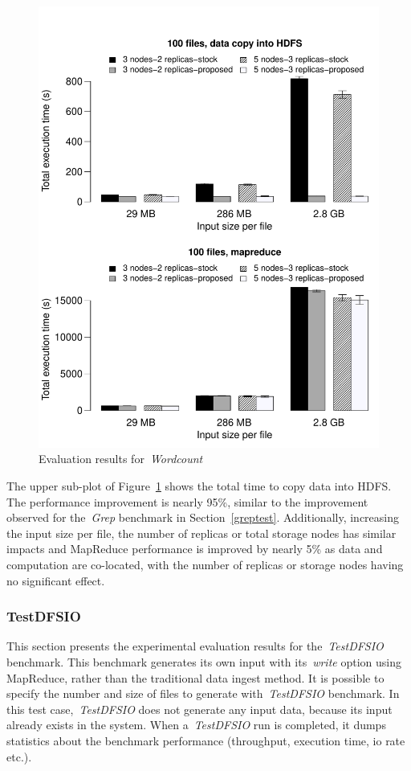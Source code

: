 \begin{figure}[!htbp]
\centering
\includegraphics[width=\columnwidth, keepaspectratio]{result2.pdf}
\caption{Evaluation results for~\textit{Wordcount}}
\label{wordcountres}
\end{figure}


The upper sub-plot of Figure~\ref{wordcountres} shows the total time to copy data into HDFS.
The performance improvement is nearly 95\%, similar to the improvement observed for
the~\textit{Grep} benchmark in Section~\ref{greptest}. Additionally, increasing the
input size per file, the number of replicas or total storage nodes has similar impacts
and MapReduce performance is improved by nearly 5\% as data and computation are co-located,
with the number of replicas or storage nodes having no significant effect.

\subsubsection{TestDFSIO}
This section presents the experimental evaluation results for the~\textit{TestDFSIO}
benchmark. This benchmark generates its own input with its~\textit{write} option using
MapReduce, rather than the traditional data ingest method. It is possible to specify
the number and size of files to generate with~\textit{TestDFSIO} benchmark. In this test
case,~\textit{TestDFSIO} does not generate any input data, because its input already exists
in the system. When a~\textit{TestDFSIO} run is completed, it dumps statistics about the
benchmark performance (throughput, execution time, io rate etc.).

